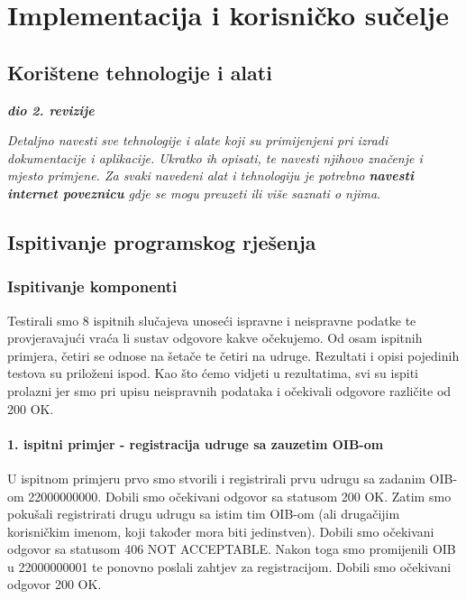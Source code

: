 \chapter{Implementacija i korisničko sučelje}
		
		
		\section{Korištene tehnologije i alati}
		
			\textbf{\textit{dio 2. revizije}}
			
			 \textit{Detaljno navesti sve tehnologije i alate koji su primijenjeni pri izradi dokumentacije i aplikacije. Ukratko ih opisati, te navesti njihovo značenje i mjesto primjene. Za svaki navedeni alat i tehnologiju je potrebno \textbf{navesti internet poveznicu} gdje se mogu preuzeti ili više saznati o njima}.
			
			
			\eject 
		
	
		\section{Ispitivanje programskog rješenja}
			
			
			\subsection{Ispitivanje komponenti}
			Testirali smo 8 ispitnih slučajeva unoseći ispravne i neispravne podatke te provjeravajući vraća li sustav odgovore kakve očekujemo. Od osam ispitnih primjera, četiri se odnose na šetače te četiri na udruge. Rezultati i opisi pojedinih testova su priloženi ispod. Kao što ćemo vidjeti u rezultatima, svi su ispiti prolazni jer smo pri upisu neispravnih podataka i očekivali odgovore različite od 200 OK.
			
			\subsubsection{1. ispitni primjer - registracija udruge sa zauzetim OIB-om}
			
			U ispitnom primjeru prvo smo stvorili i registrirali prvu udrugu sa zadanim OIB-om 22000000000. Dobili smo očekivani odgovor sa statusom 200 OK. Zatim smo pokušali registrirati drugu udrugu sa istim tim OIB-om (ali drugačijim korisničkim imenom, koji također mora biti jedinstven). Dobili smo očekivani odgovor sa statusom 406 NOT ACCEPTABLE. Nakon toga smo promijenili OIB u 22000000001 te ponovno poslali zahtjev za registracijom. Dobili smo očekivani odgovor 200 OK.
			
